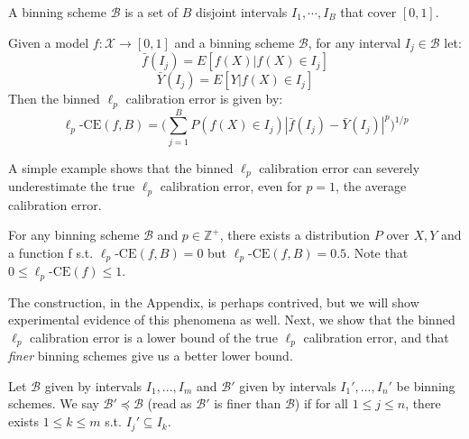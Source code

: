\begin{definition}
A binning scheme $\mathcal{B}$ is a set of $B$ disjoint intervals $I_1, \cdots, I_B$ that cover $[0, 1]$.
\end{definition}

\begin{definition}
Given a model $f : \mathcal{X} \to [0, 1]$ and a binning scheme $\mathcal{B}$, for any interval $I_j \in \mathcal{B}$ let:
\[ \bar{f}(I_j) = E[f(X) | f(X) \in I_j] \]
\[ \bar{Y}(I_j) = E[Y | f(X) \in I_j] \]
Then the binned $\ell_p$ calibration error is given by:
\[ \ell_p\mbox{-CE}(f, B) = \Big( \sum_{j=1}^B P(f(X) \in I_j) \left|\bar{f}(I_j) - \bar{Y}(I_j) \right|^p  \Big)^{1/p} \]
\end{definition}

A simple example shows that the binned $\ell_p$ calibration error can severely underestimate the true $\ell_p$ calibration error, even for $p=1$, the average calibration error.

\begin{example}
\label{ex:continuous-not-calibrated}
For any binning scheme $\mathcal{B}$ and $p \in \mathbb{Z}^+$, there exists a distribution $P$ over $X, Y$ and a function f s.t. $\ell_p\mbox{-CE}(f, B) = 0$ but $\ell_p\mbox{-CE}(f, B) = 0.5$. Note that $0 \leq \ell_p\mbox{-CE}(f) \leq 1$.
\end{example}


The construction, in the Appendix, is perhaps contrived, but we will show experimental evidence of this phenomena as well. Next, we show that the binned $\ell_p$ calibration error is a lower bound of the true $\ell_p$ calibration error, and that \emph{finer} binning schemes give us a better lower bound.

\begin{definition}
Let $\mathcal{B}$ given by intervals $I_1, ..., I_m$ and $\mathcal{B}'$ given by intervals $I_1', ..., I_n'$ be binning schemes. We say $\mathcal{B}' \preceq \mathcal{B}$ (read as $\mathcal{B}'$ is finer than $\mathcal{B}$) if for all $1 \leq j \leq n$, there exists $1 \leq k \leq m$ s.t. $I_j' \subseteq I_k$. 
\end{definition}

